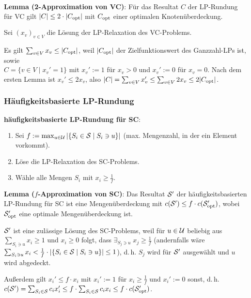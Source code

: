 \linie

\textbf{Lemma (2-Approximation von VC)}:
Für das Resultat $C$ der LP-Rundung für VC gilt $|C| \le 2 \cdot |C_\opt|$
mit $C_\opt$ einer optimalen Knotenüberdeckung.

\begin{Beweis}
    Sei $(x_v)_{v \in V}$ die Lösung der LP-Relaxation des VC-Problems.

    Es gilt $\sum_{v \in V} x_v \le |C_\opt|$,
    weil $|C_\opt|$ der Zielfunktionswert des Ganzzahl-LPs ist, sowie\\
    $C = \{v \in V \;|\; x_v' = 1\}$ mit
    $x_v' := 1$ für $x_v > 0$ und
    $x_v' := 0$ für $x_v = 0$.
    Nach dem ersten Lemma ist $x_v' \le 2x_v$,
    also $|C| = \sum_{v \in V} x_v' \le \sum_{v \in V} 2x_v \le 2 |C_\opt|$.
\end{Beweis}

\pagebreak

\subsubsection{%
    Häufigkeitsbasierte LP-Rundung%
}

\textbf{häufigkeitsbasierte LP-Rundung für SC}:
\begin{enumerate}
    \item
    Sei $f := \max_{u \in \U} |\{S_i \in \S \;|\; S_i \ni u\}|$
    (max. Mengenzahl, in der ein Element vorkommt).

    \item
    Löse die LP-Relaxation des SC-Problems.

    \item
    Wähle alle Mengen $S_i$ mit $x_i \ge \frac{1}{f}$.
\end{enumerate}

\linie

\textbf{Lemma ($f$-Approximation von SC)}:
Das Resultat $\S'$ der häufigkeitsbasierten LP-Rundung für SC ist eine Mengenüberdeckung mit
$c(\S') \le f \cdot c(\S'_\opt)$, wobei $\S'_\opt$ eine optimale Mengenüberdeckung ist.

\begin{Beweis}
    $\S'$ ist eine zulässige Lösung des SC-Problems, weil
    für $u \in \U$ beliebig
    aus $\sum_{S_i \ni u} x_i \ge 1$ und $x_i \ge 0$ folgt, dass
    $\exists_{S_j \ni u}\; x_j \ge \frac{1}{f}$
    (andernfalls wäre
    $\sum_{S_i \ni u} x_i < \frac{1}{f} \cdot |\{S_i \in \S \;|\; S_i \ni u\}| \le 1$),
    d.\,h. $S_j$ wird für $\S'$ ausgewählt und $u$ wird abgedeckt.

    Außerdem gilt $x_i' \le f \cdot x_i$ mit $x_i' := 1$ für $x_i \ge \frac{1}{f}$ und
    $x_i' := 0$ sonst, d.\,h.\\
    $c(\S') = \sum_{S_i \in \S} c_i x_i' \le f \cdot \sum_{S_i \in \S} c_i x_i \le
    f \cdot c(\S'_\opt)$.
\end{Beweis}

